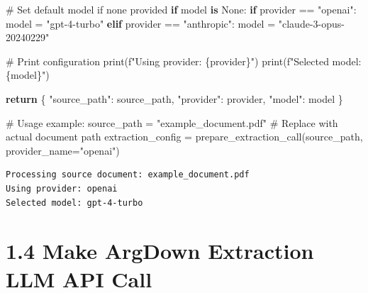 \documentclass[
  11pt,
  letterpaper,
]{book}
\newenvironment{Shaded}{\begin{snugshade}}{\end{snugshade}}
\newcommand{\BuiltInTok}[1]{\textcolor[rgb]{0.00,0.23,0.31}{#1}}
\newcommand{\CommentTok}[1]{\textcolor[rgb]{0.37,0.37,0.37}{#1}}
\newcommand{\ControlFlowTok}[1]{\textcolor[rgb]{0.00,0.23,0.31}{\textbf{#1}}}
\newcommand{\KeywordTok}[1]{\textcolor[rgb]{0.00,0.23,0.31}{\textbf{#1}}}
\newcommand{\NormalTok}[1]{\textcolor[rgb]{0.00,0.23,0.31}{#1}}
\newcommand{\OperatorTok}[1]{\textcolor[rgb]{0.37,0.37,0.37}{#1}}
\newcommand{\SpecialCharTok}[1]{\textcolor[rgb]{0.37,0.37,0.37}{#1}}
\newcommand{\SpecialStringTok}[1]{\textcolor[rgb]{0.13,0.47,0.30}{#1}}
\newcommand{\StringTok}[1]{\textcolor[rgb]{0.13,0.47,0.30}{#1}}
\newcommand{\VariableTok}[1]{\textcolor[rgb]{0.07,0.07,0.07}{#1}}
\begin{document}
\begin{Shaded}
\begin{Highlighting}[]
    \CommentTok{\# Set default model if none provided}
    \ControlFlowTok{if}\NormalTok{ model }\KeywordTok{is} \VariableTok{None}\NormalTok{:}
        \ControlFlowTok{if}\NormalTok{ provider }\OperatorTok{==} \StringTok{"openai"}\NormalTok{:}
\NormalTok{            model }\OperatorTok{=} \StringTok{"gpt{-}4{-}turbo"}
        \ControlFlowTok{elif}\NormalTok{ provider }\OperatorTok{==} \StringTok{"anthropic"}\NormalTok{:}
\NormalTok{            model }\OperatorTok{=} \StringTok{"claude{-}3{-}opus{-}20240229"}

    \CommentTok{\# Print configuration}
    \BuiltInTok{print}\NormalTok{(}\SpecialStringTok{f"Using provider: }\SpecialCharTok{\{}\NormalTok{provider}\SpecialCharTok{\}}\SpecialStringTok{"}\NormalTok{)}
    \BuiltInTok{print}\NormalTok{(}\SpecialStringTok{f"Selected model: }\SpecialCharTok{\{}\NormalTok{model}\SpecialCharTok{\}}\SpecialStringTok{"}\NormalTok{)}

    \ControlFlowTok{return}\NormalTok{ \{}
        \StringTok{"source\_path"}\NormalTok{: source\_path,}
        \StringTok{"provider"}\NormalTok{: provider,}
        \StringTok{"model"}\NormalTok{: model}
\NormalTok{    \}}

\CommentTok{\# Usage example:}
\NormalTok{source\_path }\OperatorTok{=} \StringTok{"example\_document.pdf"}  \CommentTok{\# Replace with actual document path}
\NormalTok{extraction\_config }\OperatorTok{=}\NormalTok{ prepare\_extraction\_call(source\_path, provider\_name}\OperatorTok{=}\StringTok{"openai"}\NormalTok{)}
\end{Highlighting}
\end{Shaded}

\begin{verbatim}
Processing source document: example_document.pdf
Using provider: openai
Selected model: gpt-4-turbo
\end{verbatim}

\section{1.4 Make ArgDown Extraction LLM API
Call}\label{make-argdown-extraction-llm-api-call}
\end{document}
